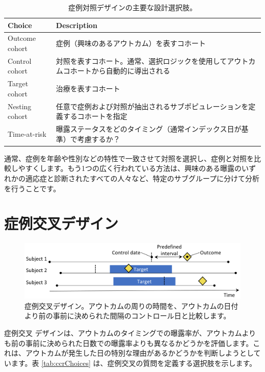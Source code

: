 \documentclass[
  11pt]{book}
\theoremstyle{definition}
\theoremstyle{definition}
\theoremstyle{definition}
\theoremstyle{definition}
\theoremstyle{remark}
\begin{document}
\begin{table}
\centering
\caption{\label{tab:ccChoices}症例対照デザインの主要な設計選択肢。}
\centering
\begin{tabular}[t]{l>{\raggedright\arraybackslash}p{9cm}}
\toprule
Choice & Description\\
\midrule
Outcome cohort & 症例（興味のあるアウトカム）を表すコホート\\
Control cohort & 対照を表すコホート。通常、選択ロジックを使用してアウトカムコホートから自動的に導出される\\
Target cohort & 治療を表すコホート\\
Nesting cohort & 任意で症例および対照が抽出されるサブポピュレーションを定義するコホートを指定\\
Time-at-risk & 曝露ステータスをどのタイミング（通常インデックス日が基準）で考慮するか？\\
\bottomrule
\end{tabular}
\end{table}

通常、症例を年齢や性別などの特性で一致させて対照を選択し、症例と対照を比較しやすくします。もう1つの広く行われている方法は、興味のある曝露のいずれかの適応症と診断されたすべての人々など、特定のサブグループに分けて分析を行うことです。

\section{症例交叉デザイン}\label{ux75c7ux4f8bux4ea4ux53c9ux30c7ux30b6ux30a4ux30f3}


\begin{figure}[h]

{\centering \includegraphics[width=0.9\linewidth]{images/PopulationLevelEstimation/caseCrossover} 

}

\caption{症例交叉デザイン。アウトカムの周りの時間を、アウトカムの日付より前の事前に決められた間隔のコントロール日と比較します。}\label{fig:caseCrossover}
\end{figure}

症例交叉 \citep{maclure_1991} デザインは、アウトカムのタイミングでの曝露率が、アウトカムよりも前の事前に決められた日数での曝露率よりも異なるかどうかを評価します。これは、アウトカムが発生した日の特別な理由があるかどうかを判断しようとしています。表 \ref{tab:ccrChoices} は、症例交叉の質問を定義する選択肢を示します。 
\end{document}
